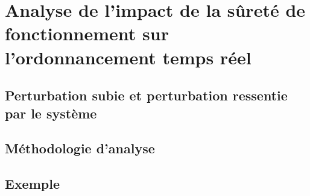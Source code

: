 \section{Analyse de l'impact de la sûreté de fonctionnement sur l'ordonnancement temps réel}
\label{sec:contribution_sdf-tr_impact1}

\subsection{Perturbation subie et perturbation ressentie par le système}
\subsection{Méthodologie d'analyse}
\subsection{Exemple}


